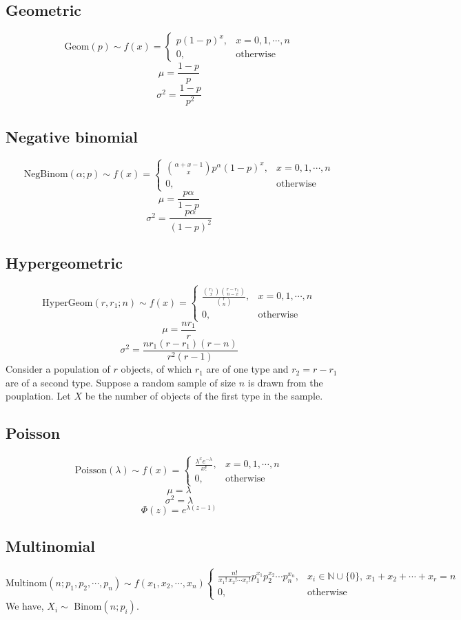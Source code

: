 \documentclass[10pt, a4paper]{extarticle}
\theoremstyle{definition}
\begin{document}
	\subsection{Geometric}
	\[\text{Geom}(p)\sim f(x)=\begin{cases}
		p(1-p)^x,&x=0,1,\cdots,n\\
		0,&\text{otherwise}
	\end{cases}\]
	\[\mu=\frac{1-p}{p}\]
	\[\sigma^2=\frac{1-p}{p^2}\]

	\subsection{Negative binomial}
	\[\text{NegBinom}(\alpha;p)\sim f(x)=\begin{cases}
		\binom{\alpha +x-1}{x}p^\alpha(1-p)^x,&x=0,1,\cdots,n\\
		0,&\text{otherwise}
	\end{cases}\]
	\[\mu=\frac{p\alpha}{1-p}\]
	\[\sigma^2=\frac{p\alpha}{(1-p)^2}\]

	\subsection{Hypergeometric}
\[\text{HyperGeom}(r,r_1;n)\sim f(x)=\begin{cases}
		\frac{\binom{r_1}{x}\binom{r-r_1}{n-x}}{\binom{r}{n}},&x=0,1,\cdots,n\\
		0,&\text{otherwise}
	\end{cases}\]
	\[\mu=\frac{nr_1}{r}\]
	\[\sigma^2=\frac{nr_1(r-r_1)(r-n)}{r^2(r-1)}\]
	Consider a population of $r$ objects, of which $r_1$ are of one type and $r_2=r-r_1$ are of a second type. Suppose a random sample of size $n$ is drawn from the pouplation. Let $X$ be the number of objects of the first type in the sample.
	
	\subsection{Poisson}
	\[\text{Poisson}(\lambda)\sim f(x)=\begin{cases}
		\frac{\lambda^xe^{-\lambda}}{x!},&x=0,1,\cdots,n\\
		0,&\text{otherwise}
	\end{cases}\]
	\[\mu=\lambda\]
	\[\sigma^2=\lambda\]
	\[\Phi(z)=e^{\lambda(z-1)}\]

	\subsection{Multinomial}
	\[\text{Multinom}(n;p_1,p_2,\cdots,p_n)\sim f(x_1,x_2,\cdots,x_n)
	\begin{cases}
		\frac{n!}{x_1!\ x_2!\cdots x_r!}p_1^{x_1}p_2^{x_2}\cdots p_n^{x_n},& x_i\in\mathbb{N}\cup\{0\},\ x_1+x_2+\cdots + x_r=n\\
		0,&\text{otherwise}
	\end{cases}
	\]
	We have, $X_i\sim$ Binom$(n;p_i)$.
\end{document}

